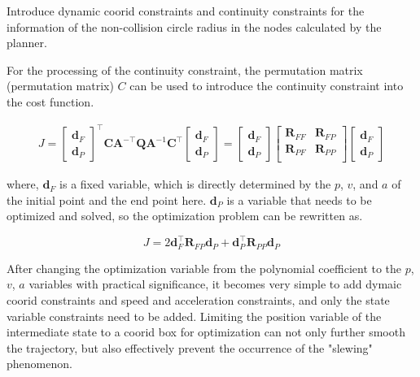 \documentclass[times,authoryear]{elsarticle}
\begin{document}
Introduce dynamic coorid constraints and continuity constraints for the information of the non-collision circle radius in the nodes calculated by the planner.

For the processing of the continuity constraint, the permutation matrix (permutation matrix) $C$ can be used to introduce the continuity constraint into the cost function.

\begin{equation}
	\begin{align}
		J = 
		\begin{bmatrix}
		\boldsymbol{d}_{F} \\
		\boldsymbol{d}_{P{}}
		\end{bmatrix} ^{\top}
		\boldsymbol{C}\boldsymbol{A}^{-\top}
		\boldsymbol{Q} \boldsymbol{A}^{-1}
		\boldsymbol{C}^{\top}
		\begin{bmatrix}
		\boldsymbol{d}_{F} \\
		\boldsymbol{d}_{P}
		\end{bmatrix}
		=
		\begin{bmatrix}
		\boldsymbol{d}_{F} \\
		\boldsymbol{d}_{P}
		\end{bmatrix}
		\begin{bmatrix}
		\boldsymbol{R}_{FF} &\boldsymbol{R}_{FP}\\
		\boldsymbol{R}_{PF} &\boldsymbol{R}_{PP}\\
		\end{bmatrix}
		\begin{bmatrix}
		\boldsymbol{d}_{F} \\
		\boldsymbol{d}_{P}
		\end{bmatrix}
	\end{align}
\end{equation}

where, $\boldsymbol{d}_{F}$ is a fixed variable, which is directly determined by the $p$, $v$, and $a$ of the initial point and the end point here. $\boldsymbol{d}_{P}$ is a variable that needs to be optimized and solved, so the optimization problem can be rewritten as.

\begin{equation}
	J = 2\boldsymbol{d}_{F}^{\top}\boldsymbol{R}_{FP}\boldsymbol{d}_{P} + \boldsymbol{d}_{P}^{\top}\boldsymbol{R}_{PP}\boldsymbol{d}_{P} 
\end{equation}

After changing the optimization variable from the polynomial coefficient to the $p$, $v$, $a$ variables with practical significance, it becomes very simple to add dymaic coorid constraints and speed and acceleration constraints, and only the state variable constraints need to be added. Limiting the position variable of the intermediate state to a coorid box for optimization can not only further smooth the trajectory, but also effectively prevent the occurrence of the "slewing" phenomenon.
\end{document}
